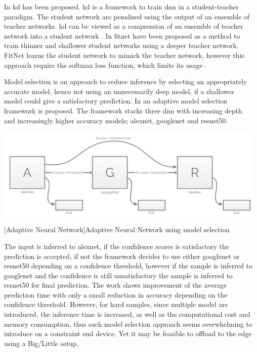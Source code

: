 \begin{enumdescript}
	In \cite{hinton_distilling_2015} \gls{kd} has been proposed. \gls{kd} is a framework to train \gls{dnn} in a student-teacher paradigm. The student network are penalized using the output of an ensemble of teacher networks. \gls{kd} can be viewed as a compression of an ensemble of teacher network into a student network \cite{cheng_survey_2017}. 
	In \cite{romero_fitnets:_2014} \gls{fitnet} have been proposed as a method to train thinner and shallower student networks using a deeper teacher network. FitNet learns the student network to mimick the teacher network, however this approach require the softmax loss function, which limits its usage \cite{cheng_survey_2017}.  
	
	\item[Model Selection] Model selection is an approach to reduce inference by selecting an appropriately accurate model, hence not using an unnecessarily deep model, if a shallower model could give a satisfactory prediction. In \cite{bolukbasi_adaptive_2017} an adaptive model selection framework is proposed. The framework stacks three \gls{dnn} with increasing depth and increasingly higher accuracy models; \gls{alexnet}, \gls{googlenet} and \gls{resnet}50. 

	\begin{minipage}[t]{\linewidth}                              
		\includegraphics[width=\linewidth]{figures/models/adaptive}
		[Adaptive Neural Network]{Adaptive Neural Network using model selection}
	\end{minipage}
	
	The input is inferred to \gls{alexnet}, if the confidence scores is satisfactory the prediction is accepted, if not the framework decides to use either \gls{googlenet} or \gls{resnet}50 depending on a confidence threshold, however if the sample is inferred to \gls{googlenet} and the confidence is still unsatisfactory the sample is inferred to \gls{resnet}50 for final prediction. The work shows improvement of the average prediction time with only a small reduction in accuracy depending on the confidence threshold. However, for hard samples, since multiple model are introduced, the inference time is increased, as well as the computational cost and memory consumption, thus such model selection approach seems overwhelming to introduce on a constraint end device. Yet it may be feasible to offload to the edge using a Big/Little setup.
	

\end{enumdescript}
